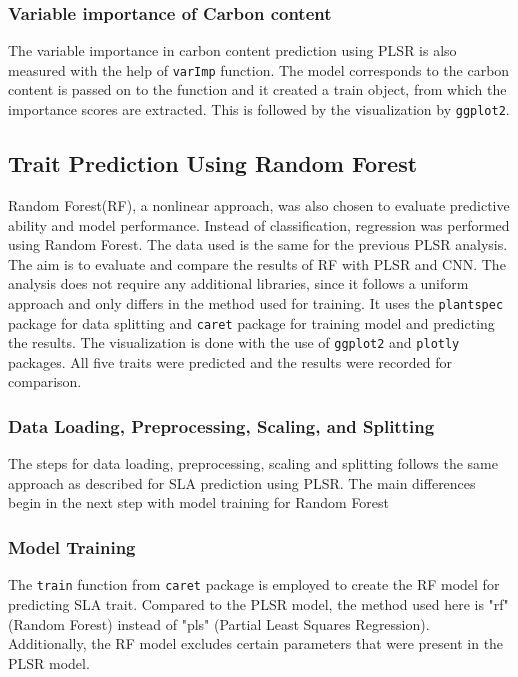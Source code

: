 \documentclass[12pt,a4paper]{report}
\begin{document}
\subsubsection*{Variable importance of Carbon content}
The variable importance in carbon content prediction using PLSR is also measured with the help of \texttt{varImp} function. The model corresponds to the carbon content is passed on to the function and it created a train object, from which the importance scores are extracted. This is followed by the visualization by \texttt{ggplot2}.\\


\subsection{Trait Prediction Using Random Forest}
Random Forest(RF), a nonlinear approach, was also chosen to evaluate predictive ability and model performance. Instead of classification, regression was performed using Random Forest. The data used is the same for the previous PLSR analysis. The aim is to evaluate and compare the results of RF with PLSR and CNN. The analysis does not require any additional libraries, since it follows a uniform approach and only differs in the method used for training. It uses the \texttt{plantspec} package for data splitting and \texttt{caret} package for training model and predicting the results. The visualization is done with the use of \texttt{ggplot2} and \texttt{plotly} packages. All five traits were predicted and the results were recorded for comparison.\\

\subsubsection*{Data Loading, Preprocessing, Scaling, and Splitting}
The steps for data loading, preprocessing, scaling and splitting follows the same approach as described for SLA prediction using PLSR. The main differences begin in the next step with model training for Random Forest


\subsubsection*{Model Training}
The \texttt{train} function from \texttt{caret} package is employed to create the RF model for predicting SLA trait. Compared to the PLSR model, the method used here is "rf" (Random Forest) instead of "pls" (Partial Least Squares Regression). Additionally, the RF model excludes certain parameters that were present in the PLSR model. \\
\end{document}
